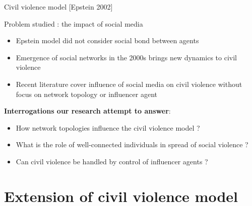 \documentclass[10pt]{beamer}
\begin{document}
\begin{frame}{Civil violence model [Epstein 2002]}



    \end{frame}

    \begin{frame}{Problem studied : the impact of social media}

        \begin{itemize}
            \item Epstein model did not consider social bond between agents
            \item Emergence of social networks in the 2000s brings new dynamics to civil violence
            \item Recent literature cover influence of social media on civil violence without focus on network topology or influencer agent
        \end{itemize}

        \hfill

        \textbf{Interrogations our research attempt to answer}:
        \begin{itemize}
            \item How network topologies influence the civil violence model ?
            \item What is the role of well-connected individuals in spread of social violence ?
            \item Can civil violence be handled by control of influencer agents ?
        \end{itemize}

    \end{frame}

    \section{Extension of civil violence model}
\end{document}
